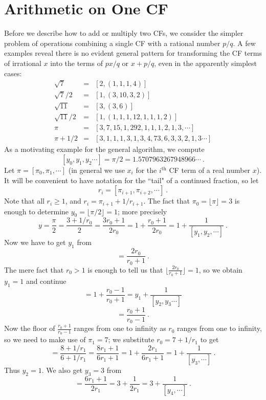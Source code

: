 \documentclass[11pt, oneside]{amsart}   	%
\begin{document}
\section{Arithmetic on One CF}
Before we describe how to add or multiply two CFs, we consider the simpler problem of operations combining a single CF with a
rational number $p/q$. A few examples reveal there is no evident general pattern for transforming the CF terms of irrational $x$ into
the terms of $px/q$ or $x + p/q$, even in the apparently simplest cases:
\begin{eqnarray*}
\sqrt{7} & = & [2, (1, 1, 1, 4)] \\
\sqrt{7}/2 & = & [1, (3, 10, 3, 2)] \\
\sqrt{11} & = & [3, (3, 6)] \\
\sqrt{11}/2 & = & [1, (1, 1, 1, 12, 1, 1, 1, 2)] \\
\pi & = & [3,7,15,1,292,1,1,1, 2, 1, 3,\cdots]\\
\pi + 1/2 & = & [3, 1, 1, 1, 3, 1, 3, 4, 73, 6, 3, 3, 2, 1, 3\cdots]
\end{eqnarray*}
As a motivating example for the general algorithm, we compute
\[[y_0,y_1,y_2 \cdots] = \pi/2 = 1.5707963267948966\cdots\ .
\]
Let $\pi = [\pi_0,\pi_1,\cdots]$ (in general we use $x_i$ for the $i^{\mbox {th}}$ CF term of a real number $x$). It will be convenient to have notation for the ``tail" of a continued fraction, so let
\[
r_i = [\pi_{i+1}, \pi_{i+2},\cdots]\ .
\]
Note that all $r_i \geq 1$, and $r_i = \pi_{i+1} + 1/r_{i+1}$. The fact that $\pi_0 = \lfloor \pi \rfloor= 3$
is enough to determine $y_0=\lfloor \pi/2 \rfloor=1$; more precisely
\begin{equation*}
y = \frac{\pi}{2} = \frac{3 + 1/r_0}{2} = \frac{3r_0+1}{2r_0} = 1 + \frac{r_0+1}{2r_0}= 1 + \frac{1}{[y_1,y_2,\cdots]}\ .
\end{equation*}
Now we have to get $y_1$ from 
\begin{equation*}
[y_1,y_2,\cdots] = \frac{2r_0}{r_0+1}\ .
\end{equation*}
The mere fact that $r_0>1$ is enough to tell us that $\lfloor \frac{2r_0}{r_0+1} \rfloor = 1$, so we obtain $y_1=1$ and continue
\begin{equation*}
[y_1,y_2,\cdots] = 1 + \frac{r_0-1}{r_0+1} = y_1 + \frac{1}{[y_2,y_3\cdots]}
\end{equation*}
\begin{equation*}
[y_2,\cdots] = \frac{r_0+1}{r_0-1} \ .
\end{equation*}
Now the floor of $\frac{r_0+1}{r_0-1}$ ranges from one to infinity as $r_0$ ranges from one to infinity,
so we need to make use of $\pi_1 = 7$; we substitute $r_0 = 7+1/r_1$ to get
\begin{equation*}
[y_2,\cdots] = \frac{8 + 1/r_1}{6 + 1/r_1} = \frac{8r_1 + 1}{6r_1 + 1} = 1 + \frac{2r_1}{6r_1 + 1}= 1 + \frac{1}{[y_3,\cdots]}\ .
\end{equation*}
Thus $y_2=1$.  We also get $y_3 = 3$ from
\begin{equation*}
[y_3,\cdots] =  \frac{6r_1 + 1}{2r_1} = 3 + \frac{1}{2r_1} = 3 + \frac{1}{[y_4,\cdots]}\ .
\end{equation*}
\end{document}
